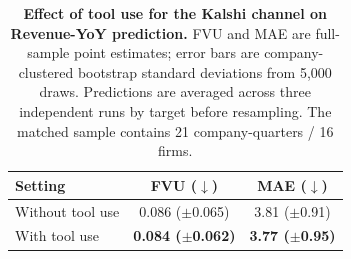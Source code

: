 \begin{table}[t]
\centering
\caption{\textbf{Effect of tool use for the Kalshi channel on Revenue-YoY prediction.}
FVU and MAE are full-sample point estimates; error bars are company-clustered bootstrap
standard deviations from 5,000 draws. Predictions are averaged across three independent runs
by target before resampling. The matched sample contains 21 company-quarters / 16 firms.}
\label{tab:kalshi_tool_fvu_mae}
\setlength{\tabcolsep}{15pt}
\begin{tabular}{lcc}
\toprule
Setting & FVU ($\downarrow$) & MAE ($\downarrow$) \\
\midrule
\quad Without tool use & 0.086 {\footnotesize($\pm$0.065)} & 3.81 {\footnotesize($\pm$0.91)} \\
\quad With tool use & \textbf{0.084 {\footnotesize($\pm$0.062)}} & \textbf{3.77 {\footnotesize($\pm$0.95)}} \\
\bottomrule
\end{tabular}
\end{table}
